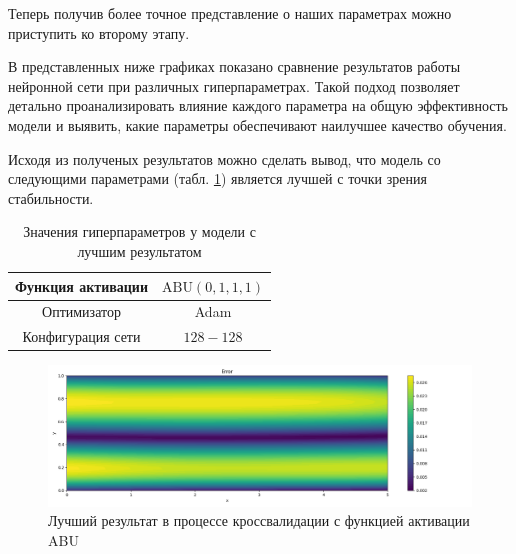 Теперь получив более точное представление о наших параметрах можно приступить
ко второму этапу.

В представленных ниже графиках показано сравнение результатов работы нейронной сети
при различных гиперпараметрах. Такой подход позволяет детально проанализировать
влияние каждого параметра на общую эффективность модели и выявить, какие параметры
обеспечивают наилучшее качество обучения.
% 
% 

% 
% 
% 

Исходя из полученых результатов можно сделать вывод, что модель со следующими
параметрами (табл. \ref{table:couette_abu_best_params}) является лучшей с точки зрения стабильности.

\begin{table}[h!]
    \centering
    \caption{Значения гиперпараметров у модели с лучшим результатом}
    \begin{tabular}{ |c|c| } 
        \hline
        Функция активации & $\text{ABU}(0, 1, 1, 1)$ \\
        \hline
        Оптимизатор & Adam \\ 
        \hline
        Конфигурация сети & $128-128$ \\ 
        \hline
    \end{tabular}
    \label{table:couette_abu_best_params}
\end{table}

\begin{figure}[ht]
    \includegraphics{data/couette_abu_error_best.png}
    \caption{Лучший результат в процессе кроссвалидации с функцией активации ABU}
    \label{fig:couette_abu_best}
\end{figure}